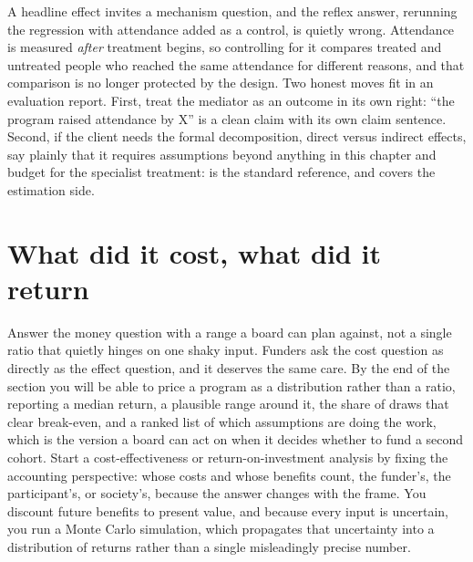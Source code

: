 \documentclass[
    a4paper,
    fontsize=10pt,
    twoside=true,
    numbers=noenddot,
]{kaobook}
\begin{document}
\begin{kaobox}[frametitle=When the next question is \enquote{did it work \emph{through} attendance?}]
A headline effect invites a mechanism question, and the reflex answer, rerunning the regression with attendance added as a control, is quietly wrong. Attendance is measured \emph{after} treatment begins, so controlling for it compares treated and untreated people who reached the same attendance for different reasons, and that comparison is no longer protected by the design. Two honest moves fit in an evaluation report. First, treat the mediator as an outcome in its own right: \enquote{the program raised attendance by X} is a clean claim with its own claim sentence. Second, if the client needs the formal decomposition, direct versus indirect effects, say plainly that it requires assumptions beyond anything in this chapter and budget for the specialist treatment: \textcite{vanderweele2015explanation} is the standard reference, and \textcite{huber2023causal} covers the estimation side.
\end{kaobox}

\section{What did it cost, what did it return}\label{sec:roi}
Answer the money question with a range a board can plan against, not a single ratio that quietly hinges on one shaky input. Funders ask the cost question as directly as the effect question, and it deserves the same care. By the end of the section you will be able to price a program as a distribution rather than a ratio, reporting a median return, a plausible range around it, the share of draws that clear break-even, and a ranked list of which assumptions are doing the work, which is the version a board can act on when it decides whether to fund a second cohort. Start a cost-effectiveness or return-on-investment analysis by fixing the accounting perspective: whose costs and whose benefits count, the funder's, the participant's, or society's, because the answer changes with the frame. You discount future benefits to present value, and because every input is uncertain, you run a Monte Carlo simulation, which propagates that uncertainty into a distribution of returns rather than a single misleadingly precise number.
\end{document}
